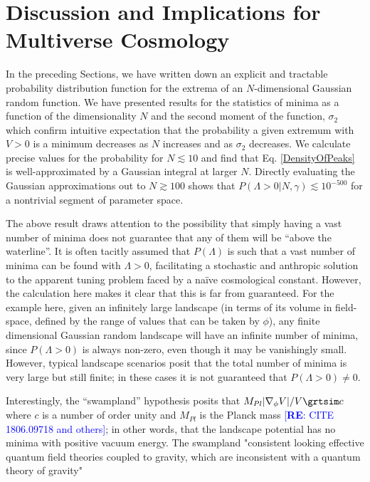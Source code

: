 \documentclass[12pt]{article}
\newcommand{\re}[1]{\textcolor{blue}{[{\bf RE}: #1]}}
\begin{document}
 
\section{Discussion and Implications for Multiverse Cosmology}

In the preceding Sections, we have  written down an explicit and tractable probability distribution function for the extrema of an $N$-dimensional  Gaussian random function. We have presented results for the statistics of minima as a function of the dimensionality $N$ and the second moment of the function, $\sigma_2$  which confirm  intuitive expectation that the probability a given extremum with $V > 0$ is a minimum decreases as $N$ increases and as $\sigma_2$ decreases. We calculate precise values for the probability for $N \lesssim10$ and find that Eq. \ref{DensityOfPeaks} is well-approximated by a Gaussian integral at larger $N$. Directly evaluating the Gaussian approximations out to $N \gtrsim 100$ shows that $P(\Lambda > 0| N, \gamma) \lesssim 10^{-500}$ for a nontrivial segment of parameter space.  

The above result draws attention to the possibility that simply having a vast number of minima does not guarantee that any of them will be ``above the waterline''.  It is often tacitly assumed that $P(\Lambda)$ is such that a vast number of minima can be found with $\Lambda>0$, facilitating a stochastic and anthropic solution to the apparent tuning problem faced by a na\"ive cosmological constant. However, the calculation here makes it clear that this is far from guaranteed.  For the example here, given an infinitely large landscape (in terms of its volume in field-space, defined by the range of values that can be taken by $\phi$), any finite dimensional Gaussian random landscape will have an infinite number of minima, since $P(\Lambda >0)$ is always non-zero, even though it may be vanishingly small. However, typical landscape scenarios posit that the total number of minima is very large but still finite; in these cases it is not guaranteed that $P(\Lambda >0) \ne 0$.  

Interestingly, the ``swampland'' hypothesis posits that $M_{Pl} |\nabla_\phi V|/ V \grtsim c$ where $c$ is a number of order unity and $M_{Pl}$ is the Planck mass \re{CITE  1806.09718 and others}; in other words, that the landscape potential has no minima with  positive vacuum energy. The swampland   "consistent looking effective quantum field theories coupled to gravity, which are inconsistent with a quantum theory of gravity"
\end{document}

